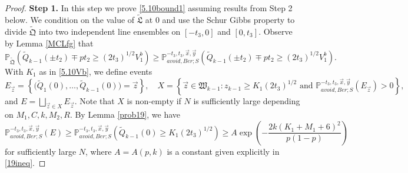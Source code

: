 \begin{proof}
	\noindent\textbf{Step 1.} In this step we prove \eqref{5.10bound1} assuming results from Step 2 below. We condition on the value of $\tilde{\mathfrak{L}}$ at 0 and use the Schur Gibbs property to divide $\tilde{\mathfrak{Q}}$ into two independent line ensembles on $[-t_3,0]$ and $[0,t_3]$. Observe by Lemma \ref{MCLfg} that
	\begin{equation}\label{5.10MC}
	\mathbb{P}_{\tilde{\mathfrak{Q}}}\left(\tilde{Q}_{k-1}(\pm t_2) \mp pt_2 \geq (2t_3)^{1/2}V_1^b\right) \geq \mathbb{P}^{-t_3,t_3,\vec{x},\vec{y}}_{avoid, Ber; S}\left(\tilde{Q}_{k-1}(\pm t_2) \mp pt_2 \geq (2t_3)^{1/2}V_1^b\right).
	\end{equation}
	With $K_1$ as in \eqref{5.10Vb}, we define events
	\[
	E_{\vec{z}} = \left\{\big(\tilde{Q}_1(0),\dots,\tilde{Q}_{k-1}(0)\big) = \vec{z}\right\}, \quad X = \left\{ \vec{z}\in\mathfrak{W}_{k-1} : z_{k-1} \geq K_1(2t_3)^{1/2} \mbox { and } \mathbb{P}^{-t_3,t_3,\vec{x},\vec{y}}_{avoid,Ber; S}(E_{\vec{z}}) > 0\right\},
	\]
	and $E = \bigsqcup_{\vec{z} \in X} E_{\vec{z}}$. Note that $X$ is non-empty if $N$ is sufficiently large depending on $M_1,C,k,M_2,R$. By Lemma \ref{prob19}, we have
	\begin{equation}\label{5.10Ebound}
	\mathbb{P}^{-t_3,t_3,\vec{x},\vec{y}}_{avoid, Ber; S}(E) \geq \mathbb{P}^{-t_3,t_3,\vec{x},\vec{y}}_{avoid,Ber; S}\left(\tilde{Q}_{k-1}(0) \geq K_1(2t_3)^{1/2}\right) \geq A\exp\left(-\frac{2k(K_1+M_1+6)^2}{p(1-p)}\right)
	\end{equation}
	for sufficiently large $N$, where $A = A(p,k)$ is a constant given explicitly in \eqref{19ineq}.
	

\end{proof}
